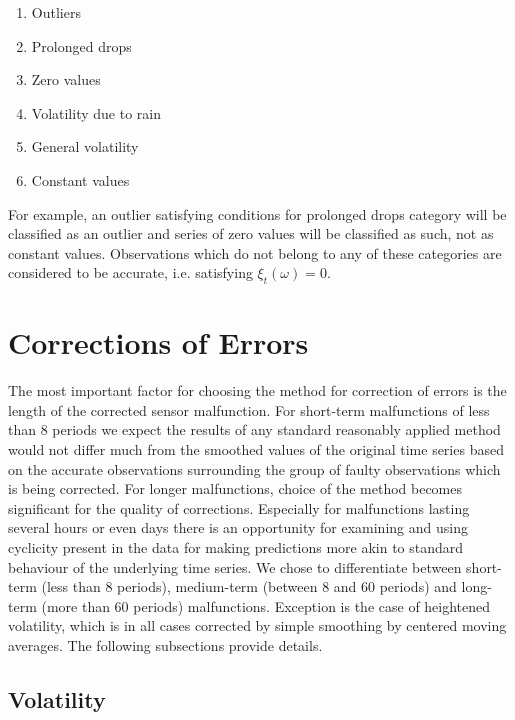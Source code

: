 \documentclass[12pt,a4paper]{article}
\begin{document}
\begin{enumerate}
    \item Outliers
    \item Prolonged drops
    \item Zero values
    \item Volatility due to rain
    \item General volatility
    \item Constant values
\end{enumerate}

For example, an outlier satisfying conditions for prolonged drops category will be classified as an outlier and series of zero values will be classified as such, not as constant values. Observations which do not belong to any of these categories are considered to be accurate, i.e. satisfying $\xi_t(\omega) = 0$.






\newpage
\section{Corrections of Errors}

The most important factor for choosing the method for correction of errors is the length of the corrected sensor malfunction. For short-term malfunctions of less than 8 periods we expect the results of any standard reasonably applied method would not differ much from the smoothed values of the original time series based on the accurate observations surrounding the  group of faulty observations which is being corrected. For longer malfunctions, choice of the method becomes significant for the quality of corrections. Especially for malfunctions lasting several hours or even days there is an opportunity for examining and using cyclicity present in the data for making predictions more akin to standard behaviour of the underlying time series. We chose to differentiate between short-term (less than 8 periods), medium-term (between 8 and 60 periods) and long-term (more than 60 periods) malfunctions. Exception is the case of heightened volatility, which is in all cases corrected by simple smoothing by centered moving averages. The following subsections provide details.



\subsection{Volatility}
\end{document}
